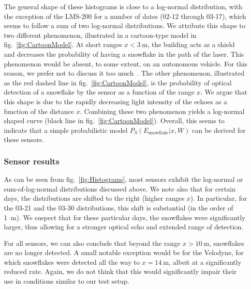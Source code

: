 The general shape of these histograms is close to a log-normal distribution, with the exception of the LMS-200 for a number of dates (02-12 through 03-17), which seems to follow a sum of two log-normal distributions. We attribute this shape to two different phenomenon, illustrated in a cartoon-type model in fig.~\ref{fig:CartoonModel}. At short ranges $x<\SI{3}{\meter}$, the building acts as a shield and decreases the probability of having a snowflake in the path of the laser. This phenomenon would be absent, to some extent, on an autonomous vehicle. For this reason, we prefer not to discuss it too much~. The other phenomenon, illustrated as the red dashed line in fig.~\ref{fig:CartoonModel}, is the probability of optical detection of a snowflake by the sensor as a function of the range $x$. We argue that this shape is due to the rapidly decreasing light intensity of the echoes as a function of the distance $x$. Combining these two phenomenon yields a log-normal shaped curve (black line in fig.~\ref{fig:CartoonModel}). Overall, this seems to indicate that a simple probabilistic model $P_S(E_\text{snowflake}|x,W)$ can be derived for these sensors. 


\subsubsection{Sensor results}
As can be seen from fig.~\ref{fig:Histograms}, most sensors exhibit the log-normal or sum-of-log-normal distributions discussed above. We note also that for certain days, the distributions are shifted to the right (higher ranges $x$). In particular, for the 03-21 and the 03-30 distributions, this shift is substantial (in the order of \SI{1}{\meter}). We suspect that for these particular days, the snowflakes were significantly larger, thus allowing for a stronger optical echo and extended range of detection. 

For all sensors, we can also conclude that beyond the range $x>\SI{10}{\meter}$, snowflakes are no longer detected. A small notable exception would be for the Velodyne, for which snowflakes were detected all the way to $x=\SI{14}{\meter}$, albeit at a significantly reduced rate. Again, we do not think that this would significantly impair their use in conditions similar to our test setup. 

